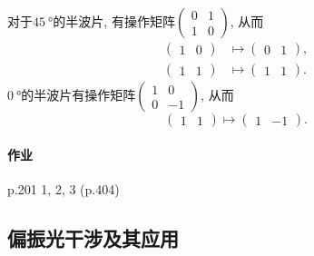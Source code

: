 \documentclass{ctexart}
\begin{document}
\begin{sample}
    \begin{ex}
        对于$\SI{45}{\degree}$的半波片, 有操作矩阵$\displaystyle \begin{pmatrix}
            0 & 1 \\ 1 & 0
        \end{pmatrix}$, 从而
        \begin{align*}
            \begin{pmatrix}
                1 & 0
            \end{pmatrix} & \mapsto \begin{pmatrix}
                0 & 1
            \end{pmatrix}, \\
            \begin{pmatrix}
                1 & 1
            \end{pmatrix} & \mapsto \begin{pmatrix}
                1 & 1
            \end{pmatrix}.
        \end{align*}
        $\SI{0}{\degree}$的半波片有操作矩阵$\displaystyle \begin{pmatrix}
            1 & 0 \\ 0 & -1
        \end{pmatrix}$, 从而
        \[ \begin{pmatrix}
                1 & 1
            \end{pmatrix}  \mapsto \begin{pmatrix}
                1 & -1
            \end{pmatrix}. \]
    \end{ex}
\end{sample}

\paragraph{作业} %
\label{par:作业}

p.201 1, 2, 3 (p.404)




\subsection{偏振光干涉及其应用} %
\label{sub:偏振光干涉及其应用}
\end{document}
